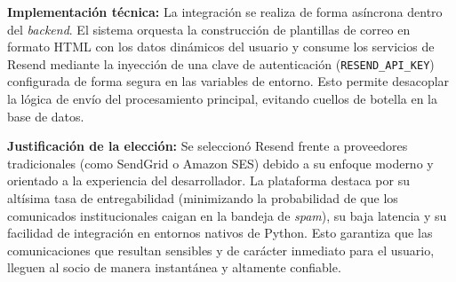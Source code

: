\textbf{Implementación técnica:} La integración se realiza de forma asíncrona dentro del \textit{backend}. El sistema orquesta la construcción de plantillas de correo en formato HTML con los datos dinámicos del usuario y consume los servicios de Resend mediante la inyección de una clave de autenticación (\texttt{RESEND\_API\_KEY}) configurada de forma segura en las variables de entorno. Esto permite desacoplar la lógica de envío del procesamiento principal, evitando cuellos de botella en la base de datos.

\textbf{Justificación de la elección:} Se seleccionó Resend frente a proveedores tradicionales (como SendGrid o Amazon SES) debido a su enfoque moderno y orientado a la experiencia del desarrollador. La plataforma destaca por su altísima tasa de entregabilidad (minimizando la probabilidad de que los comunicados institucionales caigan en la bandeja de \textit{spam}), su baja latencia y su facilidad de integración en entornos nativos de Python. Esto garantiza que las comunicaciones que resultan sensibles y de carácter inmediato para el usuario, lleguen al socio de manera instantánea y altamente confiable.
